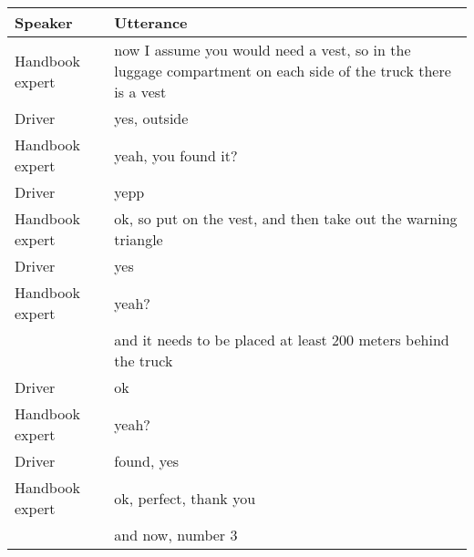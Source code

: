 \begin{table}[H]
\begin{tabular}{p{3cm}p{8cm}}
Speaker & Utterance \\
\hline



Handbook expert & now I assume you would need a vest, so in the luggage compartment on each side of the truck there is a vest             \\
Driver          & yes, outside                                                                                                            \\
Handbook expert & yeah, you found it?                                                                                                     \\
Driver          & yepp                                                                                                                    \\
Handbook expert & ok, so put on the vest, and then take out the warning triangle                                                          \\
Driver          & yes                                                                                                                     \\
Handbook expert & yeah?                                                                                                                   \\
                & and it needs to be placed at least 200 meters behind the truck                                                          \\
Driver          & ok                                                                                                                      \\
Handbook expert & yeah?                                                                                                                   \\
Driver          & found, yes                                                                                                              \\
Handbook expert & ok, perfect, thank you                                                                                                  \\
                & and now, number 3                                                                                                       \\

\end{tabular}
\end{table}
